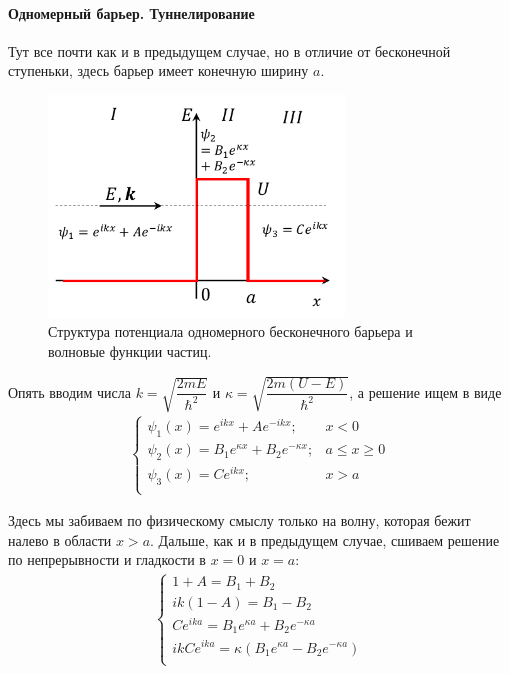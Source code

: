 \documentclass[12pt]{article}
\begin{document}
\paragraph{Одномерный барьер. Туннелирование}
Тут все почти как и в предыдущем случае, но в отличие от бесконечной ступеньки, здесь барьер имеет конечную ширину $a$. 

\begin{figure}[h]
    \centering
    \includegraphics[width=0.7\textwidth,height=\textheight,keepaspectratio]{Seminar_04/pics/pic_02.pdf}
    \caption{Структура потенциала одномерного бесконечного барьера и волновые функции частиц.}
    \label{fig:sem_04}
\end{figure}

\vspace{2mm}
Опять вводим числа $k = \sqrt{\dfrac{2mE}{\hbar^2}}$ и $ \kappa = \sqrt{\dfrac{2m(U -E)}{\hbar^2}}$, а решение ищем в виде
\begin{gather*}
    \begin{cases}
         \psi_1(x) = e^{ikx} + A e^{-ikx}; &x<0  \\
         \psi_2(x) = B_1e^{\kappa x} + B_2e^{-\kappa x}; & a\le x\ge 0  \\
         \psi_3(x) = Ce^{ikx} ; &x>a  \\
    \end{cases}
\end{gather*}

Здесь мы забиваем по физическому смыслу только на волну, которая бежит налево в области $x>a$. Дальше, как и в предыдущем случае, сшиваем решение по непрерывности и гладкости в $x=0$ и $x=a$:
\begin{gather*}
    \begin{cases}
         1+A = B_1+B_2  \\
         ik(1-A) = B_1-B_2 \\
         Ce^{ika} = B_1e^{\kappa a} + B_2e^{-\kappa a}\\
         ikCe^{ika} = \kappa (B_1e^{\kappa a} - B_2e^{-\kappa a})\\
    \end{cases}
\end{gather*}
\end{document}
